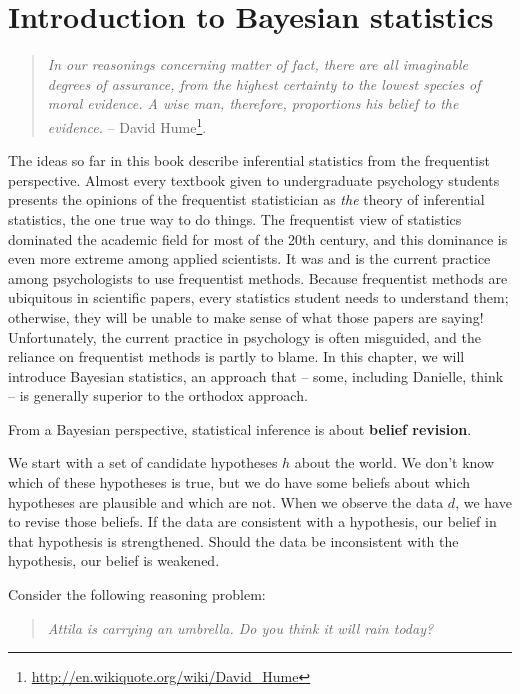 \documentclass[
  11pt,
  a4paper,
  twoside,symmetric,openright]{book}
\theoremstyle{break}
\theoremstyle{break}
\begin{document}
\chapter{Introduction to Bayesian statistics}\label{bayes}

\begin{quote}
\emph{In our reasonings concerning matter of fact, there are all imaginable degrees of assurance, from the highest certainty to the lowest species of moral evidence. A wise man, therefore, proportions his belief to the evidence.}
-- David Hume\footnote{\url{http://en.wikiquote.org/wiki/David_Hume}}.
\end{quote}

The ideas so far in this book describe inferential statistics from the frequentist perspective. Almost every textbook given to undergraduate psychology students presents the opinions of the frequentist statistician as \emph{the} theory of inferential statistics, the one true way to do things. The frequentist view of statistics dominated the academic field for most of the 20th century, and this dominance is even more extreme among applied scientists. It was and is the current practice among psychologists to use frequentist methods. Because frequentist methods are ubiquitous in scientific papers, every statistics student needs to understand them; otherwise, they will be unable to make sense of what those papers are saying! Unfortunately, the current practice in psychology is often misguided, and the reliance on frequentist methods is partly to blame. In this chapter, we will introduce Bayesian statistics, an approach that -- some, including Danielle, think -- is generally superior to the orthodox approach.

From a Bayesian perspective, statistical inference is about \textbf{belief revision}.

We start with a set of candidate hypotheses \(h\) about the world. We don't know which of these hypotheses is true, but we do have some beliefs about which hypotheses are plausible and which are not. When we observe the data \(d\), we have to revise those beliefs. If the data are consistent with a hypothesis, our belief in that hypothesis is strengthened. Should the data be inconsistent with the hypothesis, our belief is weakened.

Consider the following reasoning problem:

\begin{quote}
\emph{Attila is carrying an umbrella. Do you think it will rain today?}
\end{quote}
\end{document}
